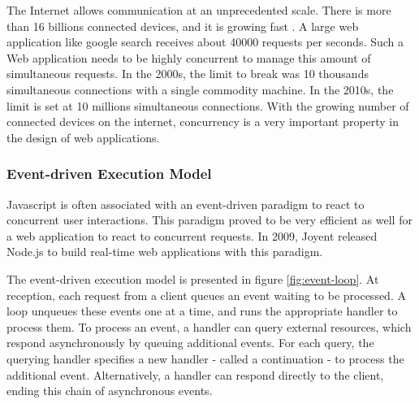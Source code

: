 The Internet allows communication at an unprecedented scale.
There is more than 16 billions connected devices, and it is growing fast \cite{Hilbert2011}.
A large web application like google search receives about \num{40000} requests per seconds.
Such a Web application needs to be highly concurrent to manage this amount of simultaneous requests.
In the 2000s, the limit to break was 10 thousands simultaneous connections with a single commodity machine.
In the 2010s, the limit is set at 10 millions simultaneous connections.
With the growing number of connected devices on the internet, concurrency is a very important property in the design of web applications.

\subsubsection{Event-driven Execution Model} \label{chapter2:web-as-a-platform:javascript:event-loop}

Javascript is often associated with an event-driven paradigm to react to concurrent user interactions.
This paradigm proved to be very efficient as well for a web application to react to concurrent requests.
In 2009, Joyent released Node.js to build real-time web applications with this paradigm.

\begin{figure}
\end{figure}

The event-driven execution model is presented in figure \ref{fig:event-loop}.
At reception, each request from a client queues an event waiting to be processed.
A loop unqueues these events one at a time, and runs the appropriate handler to process them.
To process an event, a handler can query external resources, which respond asynchronously by queuing additional events.
For each query, the querying handler specifies a new handler - called a continuation - to process the additional event.
Alternatively, a handler can respond directly to the client, ending this chain of asynchronous events.

